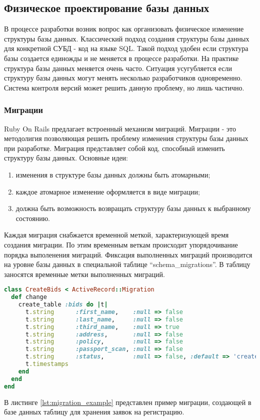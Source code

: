 \subsection{Физическое проектирование базы данных}
В процессе разработки возник вопрос как организовать физическое изменение
структуры базы данных. Классический подход создания структуры базы данных для
конкретной СУБД - код на языке SQL. Такой подход удобен если структура базы
создается единожды и не меняется в процессе разработки. На практике структура
базы данных меняется очень часто. Ситуация усугубляется если структуру базы
данных могут менять несколько разработчиков одновременно. Система контроля
версий может решить данную проблему, но лишь частично.

\subsubsection{Миграции}
Ruby On Rails предлагает встроенный механизм миграций. Миграции - это
методолигия позволяющая решить проблему изменения структуры базы данных при
разработке. Миграция представляет собой код, способный изменить структуру базы
данных.
Основные идеи:
\begin{enumerate}
  \item изменения в структуре базы данных должны быть атомарными;
  \item каждое атомарное изменение оформляется в виде миграции;
  \item должна быть возможность возвращать структуру базы данных к выбранному
состоянию.
\end{enumerate}

Каждая миграция снабжается временной меткой, характеризующей время создания
миграции. По этим временным веткам происходит упорядочивание порядка выполенения
миграций. Фиксация выполненных миграций производится на уровне базы данных в
специальной таблице “schema\_migrations”. В таблицу заносятся временные метки
выполненных миграций.

\begin{lstlisting}[language=Ruby,caption=Пример миграций
,label={lst:migration_example}] 
class CreateBids < ActiveRecord::Migration
  def change
    create_table :bids do |t|
      t.string      :first_name,    :null => false
      t.string      :last_name,     :null => false
      t.string      :third_name,    :null => true
      t.string      :address,       :null => false
      t.string      :policy,        :null => false
      t.string      :passport_scan, :null => false
      t.string      :status,        :null => false, :default => 'created'
      t.timestamps
    end
  end
end
\end{lstlisting}

В листинге \ref{lst:migration_example} представлен пример миграции, создающей в
базе данных таблицу для хранения заявок на регистрацию.
